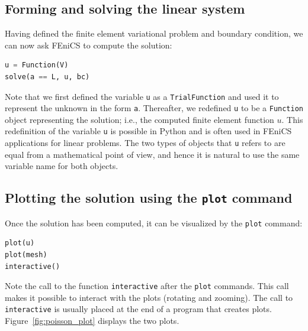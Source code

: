 \documentclass[graybox,envcountchap,sectrefs,final]{svmonodo}
\begin{document}
\subsection{Forming and solving the linear system}

Having defined the finite element variational problem and boundary
condition, we can now ask FEniCS to compute the solution:

\begin{lstlisting}[language=Python,style=graycolor]
u = Function(V)
solve(a == L, u, bc)
\end{lstlisting}


Note that we first defined the variable \texttt{u} as a \texttt{TrialFunction} and
used it to represent the unknown in the form \texttt{a}. Thereafter, we
redefined \texttt{u} to be a \texttt{Function} object representing the solution;
i.e., the computed finite element function $u$. This redefinition of
the variable \texttt{u} is possible in Python and is often used in FEniCS
applications for linear problems. The two types of objects that \texttt{u}
refers to are equal from a mathematical point of view, and hence it is
natural to use the same variable name for both objects.


\subsection{Plotting the solution using the \texttt{plot} command}


Once the solution has been computed, it can be visualized by
the \texttt{plot} command:

\begin{lstlisting}[language=Python,style=graycolor]
plot(u)
plot(mesh)
interactive()
\end{lstlisting}
Note the call to the function \texttt{interactive} after the \texttt{plot} commands.
This call makes it possible to interact with the plots (rotating and
zooming). The call to \texttt{interactive} is usually placed at the end of a
program that creates plots.  Figure~\ref{fig:poisson_plot} displays the
two plots.
\end{document}
